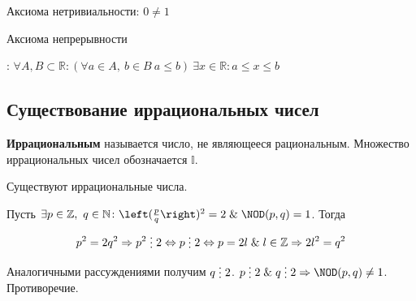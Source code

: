 Аксиома нетривиальности: $0 \neq 1$

\hypertarget{eq:continuity_axiom}{Аксиома непрерывности}: $\forall A, B \subset \mathbb R \colon
(\forall a \in A, \ b \in B \ a \leqslant b) \
\exists x \in \mathbb R \colon
a \leqslant x \leqslant b$

\subsection{Существование иррациональных чисел}
  \textbf{Иррациональным} называется число, не являющееся рациональным.
Множество иррациональных чисел обозначается $\mathbb I$.

\begin{statement}
Существуют иррациональные числа.
\end{statement}
\begin{proofcontra}
Пусть $\exists p \in \mathbb Z, \ q \in \mathbb N \colon \left( \frac{p}q \right)^2 = 2 \lAnd \NOD(p, q) = 1$.
Тогда
\begin{equation*}
p^2 = 2q^2 \Rightarrow p^2 \mult 2 \Leftrightarrow p \mult 2
\Leftrightarrow p = 2l \lAnd l \in \mathbb Z \Rightarrow 2l^2 = q^2
\end{equation*}

Аналогичными рассуждениями получим $q \mult 2$.
$p \mult 2 \lAnd q \mult 2 \Rightarrow \NOD(p, q) \neq 1$.
Противоречие.
\end{proofcontra}

